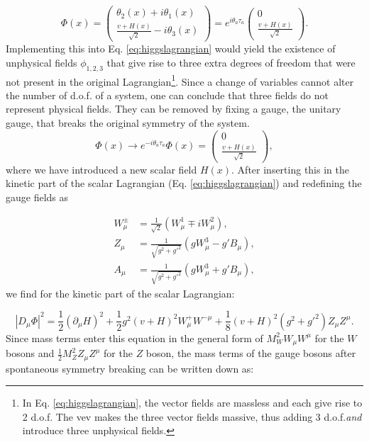 \begin{equation}
\Phi(x) = \begin{pmatrix} \theta_2(x) + i\theta_1(x) \\ \frac{v+H(x)}{\sqrt{2}} - i\theta_3(x) \end{pmatrix} = e^{i\theta_a\tau_a}\begin{pmatrix} 0 \\ \frac{v+H(x)}{\sqrt{2}} \end{pmatrix}.
\end{equation}
Implementing this into Eq. \ref{eq:higgslagrangian} would yield the existence of unphysical fields $\phi_{1,2,3}$ that give rise to three extra degrees of freedom that were not present in the original Lagrangian\footnote{In Eq. \ref{eq:higgslagrangian}, the vector fields are massless and each give rise to 2 d.o.f. The vev makes the three vector fields massive, thus adding 3 d.o.f.\textit{and} introduce three unphysical fields.}. Since a change of variables cannot alter the number of d.o.f. of a system, one can conclude that three fields do not represent physical fields. They can be removed by fixing a gauge, the unitary gauge, that breaks the original symmetry of the system.
\begin{equation}
\label{eq:vev}
\Phi(x) \rightarrow e^{-i\theta_a\tau_a}\Phi(x) = \begin{pmatrix} 0 \\ \frac{v+H(x)}{\sqrt{2}} \end{pmatrix},
\end{equation}
where we have introduced a new scalar field $H(x)$. After inserting this in the kinetic part of the scalar Lagrangian (Eq. \ref{eq:higgslagrangian}) and redefining the gauge fields as

\begin{equation}
\begin{split}
W^\pm_\mu &= \frac{1}{\sqrt{2}}\left(W^1_\mu \mp iW^2_\mu\right),\\
Z_\mu &= \frac{1}{\sqrt{g^2 + g'^2}}\left(gW^3_\mu - g'B_\mu\right),\\
A_\mu &= \frac{1}{\sqrt{g^2 + g'^2}}\left(gW^3_\mu + g'B_\mu\right),
\end{split}
\end{equation}
we find for the kinetic part of the scalar Lagrangian:

\begin{equation}
|D_\mu\Phi|^2 = \frac{1}{2} \left(\partial_\mu H\right)^2 + \frac{1}{2}g^2\left(v+H\right)^2W^+_\mu W^{-\mu} + \frac{1}{8}\left(v+H\right)^2 \left(g^2 + g'^2\right)Z_\mu Z^\mu.
\end{equation}
Since mass terms enter this equation in the general form of $M^2_W W_\mu W^\mu$ for the $W$ bosons and $\frac{1}{2}M_Z^2 Z_\mu Z^\mu$ for the $Z$ boson, the mass terms of the gauge bosons after spontaneous symmetry breaking can be written down as:

